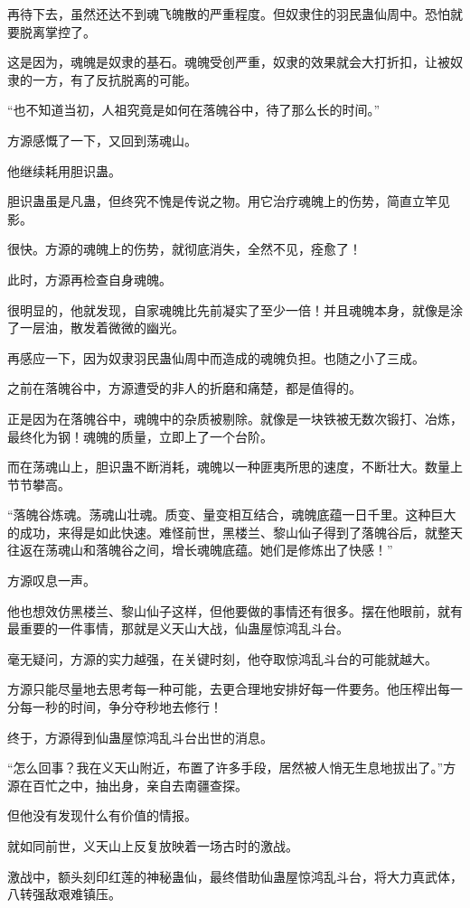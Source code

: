 \begin{this_body}
再待下去，虽然还达不到魂飞魄散的严重程度。但奴隶住的羽民蛊仙周中。恐怕就要脱离掌控了。

这是因为，魂魄是奴隶的基石。魂魄受创严重，奴隶的效果就会大打折扣，让被奴隶的一方，有了反抗脱离的可能。

“也不知道当初，人祖究竟是如何在落魄谷中，待了那么长的时间。”

方源感慨了一下，又回到荡魂山。

他继续耗用胆识蛊。

胆识蛊虽是凡蛊，但终究不愧是传说之物。用它治疗魂魄上的伤势，简直立竿见影。

很快。方源的魂魄上的伤势，就彻底消失，全然不见，痊愈了！

此时，方源再检查自身魂魄。

很明显的，他就发现，自家魂魄比先前凝实了至少一倍！并且魂魄本身，就像是涂了一层油，散发着微微的幽光。

再感应一下，因为奴隶羽民蛊仙周中而造成的魂魄负担。也随之小了三成。

之前在落魄谷中，方源遭受的非人的折磨和痛楚，都是值得的。

正是因为在落魄谷中，魂魄中的杂质被剔除。就像是一块铁被无数次锻打、冶炼，最终化为钢！魂魄的质量，立即上了一个台阶。

而在荡魂山上，胆识蛊不断消耗，魂魄以一种匪夷所思的速度，不断壮大。数量上节节攀高。

“落魄谷炼魂。荡魂山壮魂。质变、量变相互结合，魂魄底蕴一日千里。这种巨大的成功，来得是如此快速。难怪前世，黑楼兰、黎山仙子得到了落魄谷后，就整天往返在荡魂山和落魄谷之间，增长魂魄底蕴。她们是修炼出了快感！”

方源叹息一声。

他也想效仿黑楼兰、黎山仙子这样，但他要做的事情还有很多。摆在他眼前，就有最重要的一件事情，那就是义天山大战，仙蛊屋惊鸿乱斗台。

毫无疑问，方源的实力越强，在关键时刻，他夺取惊鸿乱斗台的可能就越大。

方源只能尽量地去思考每一种可能，去更合理地安排好每一件要务。他压榨出每一分每一秒的时间，争分夺秒地去修行！

终于，方源得到仙蛊屋惊鸿乱斗台出世的消息。

“怎么回事？我在义天山附近，布置了许多手段，居然被人悄无生息地拔出了。”方源在百忙之中，抽出身，亲自去南疆查探。

但他没有发现什么有价值的情报。

就如同前世，义天山上反复放映着一场古时的激战。

激战中，额头刻印红莲的神秘蛊仙，最终借助仙蛊屋惊鸿乱斗台，将大力真武体，八转强敌艰难镇压。


\end{this_body}
